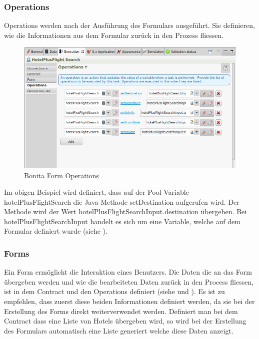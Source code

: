 \subsubsection{Operations}
\label{sec:analyse:bonita:forms:operations}
Operations werden nach der Ausführung des Formulars ausgeführt. Sie definieren, wie die Informationen aus dem Formular zurück in den Prozess fliessen.

\begin{figure}[H]
	\centering
	\includegraphics[width=1\textwidth]{images/bonita-operations.png}
	\caption{Bonita Form Operations}
	\label{fig:analyse:bonita:forms:operations}
\end{figure}
Im obigen Beispiel wird definiert, dass auf der Pool Variable hotelPlusFlightSearch die Java Methode setDestination aufgerufen wird. Der Methode wird der Wert hotelPlusFlightSearchInput.destination übergeben. Bei hotelPlusFlightSearchInput handelt es sich um eine Variable, welche auf dem Formular definiert wurde (siehe ).

\subsubsection{Forms}
\label{sec:analyse:bonita:forms:forms}
Ein Form ermöglicht die Interaktion eines Benutzers. Die Daten die an das Form übergeben werden und wie die bearbeiteten Daten zurück in den Process fliessen, ist in dem Contract und den Operations definiert (siehe  und  ). Es ist zu empfehlen, dass zuerst diese beiden Informationen definiert werden, da sie bei der Erstellung des Forms direkt weiterverwendet werden. Definiert man bei dem Contract dass eine Liste von Hotels übergeben wird, so wird bei der Erstellung des Formulars automatisch eine Liste generiert welche diese Daten anzeigt. 

